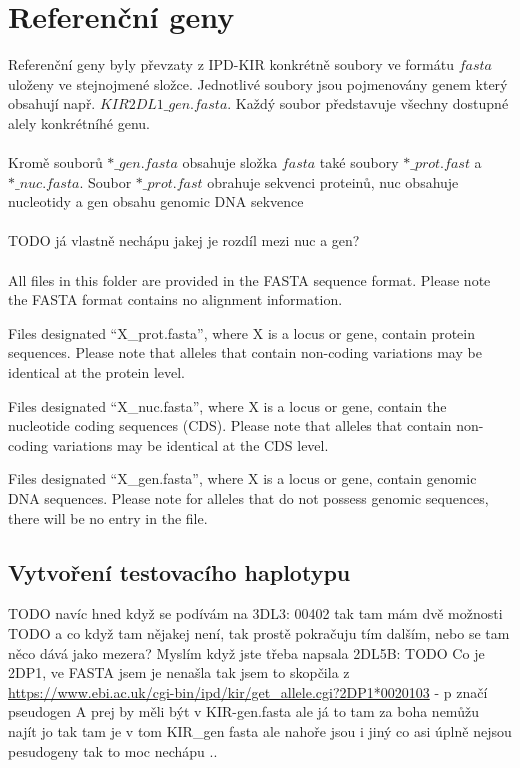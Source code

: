 \documentclass[czech,DP]{thesiskiv}
\begin{document}
\section{Referenční geny}
Referenční geny byly převzaty z IPD-KIR \cite{imgt_hla_database} konkrétně soubory ve formátu $fasta$ uloženy ve stejnojmené složce. Jednotlivé soubory jsou pojmenovány genem který obsahují např. $KIR2DL1\_gen.fasta$. Každý soubor představuje všechny dostupné alely konkrétníhé genu.
\\
\\
Kromě souborů $*\_gen.fasta$ obsahuje složka $fasta$ také soubory $*\_prot.fast$ a $*\_nuc.fasta$. Soubor $*\_prot.fast$ obrahuje sekvenci proteinů, nuc obsahuje nucleotidy a gen obsahu genomic DNA sekvence
\\
\\
TODO já vlastně nechápu jakej je rozdíl mezi nuc a gen? 
\\
\\
All files in this folder are provided in the FASTA sequence format. Please note the FASTA format contains no alignment information.

Files designated “X\_prot.fasta”, where X is a locus or gene, contain protein sequences. Please note that alleles that contain non-coding variations may be identical at the protein level. 

Files designated “X\_nuc.fasta”, where X is a locus or gene, contain the nucleotide coding sequences (CDS). Please note that alleles that contain non-coding variations may be identical at the CDS level.

Files designated “X\_gen.fasta”, where X is a locus or gene, contain genomic DNA sequences. Please note for alleles that do not possess genomic sequences, there will be no entry in the file.

\subsection{Vytvoření testovacího haplotypu}

TODO navíc hned když se podívám na 3DL3: 00402 tak tam mám dvě možnosti
TODO a co když tam nějakej není, tak prostě pokračuju tím dalším, nebo se tam něco dává jako mezera? Myslím když jste třeba napsala 2DL5B:
TODO Co je 2DP1, ve FASTA jsem je nenašla tak jsem to skopčila z \url{https://www.ebi.ac.uk/cgi-bin/ipd/kir/get_allele.cgi?2DP1*0020103} - p značí pseudogen
A prej by měli být v KIR-gen.fasta ale já to tam za boha nemůžu najít
jo tak tam je v tom KIR\_gen fasta
ale nahoře jsou i jiný co asi úplně nejsou pesudogeny tak to moc nechápu ..
 
\end{document}
